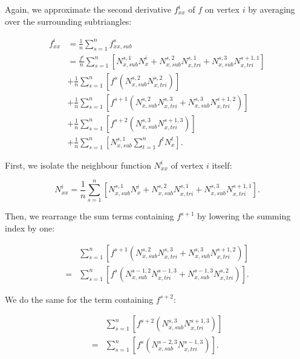 \documentclass{article}
\begin{document}
Again, we approximate the second derivative $f_{xx}^i$ of $f$ on vertex $i$ by averaging over the surrounding subtriangles:

\begin{equation} \label{eq:disc_fxxi}
\begin{split}
f_{xx}^i &= \frac{1}{n} \sum_{s=1}^n f_{xx,sub}^s \\
     &= \frac{f^i}{n} \sum_{s=1}^n \left[ N_{x,sub}^{s,1} N_x^i + N_{x,sub}^{s,2} N_{x,tri}^{s,1} + N_{x,sub}^{s,3} N_{x,tri}^{s+1,1} \right] \\
     & + \frac{1}{n} \sum_{s=1}^n \left[ f^s \left( N_{x,sub}^{s,2} N_{x,tri}^{s,2} \right) \right] \\
     & + \frac{1}{n} \sum_{s=1}^n \left[ f^{s+1} \left( N_{x,sub}^{s,2} N_{x,tri}^{s,3} + N_{x,sub}^{s,3} N_{x,tri}^{s+1,2} \right) \right] \\
     & + \frac{1}{n} \sum_{s=1}^n \left[ f^{s+2} \left( N_{x,sub}^{s,3} N_{x,tri}^{s+1,3} \right) \right] \\
     & + \frac{1}{n} \sum_{s=1}^n \left[ N_{x,sub}^{s,1} \sum_{t=1}^n f^t N_x^t \right].
\end{split}
\end{equation}

First, we isolate the neighbour function $N_{xx}^i$  of vertex $i$ itself:

\begin{equation} \label{eq:disc_Nxxi}
N_{xx}^i = \frac{1}{n} \sum_{s=1}^n \left[ N_{x,sub}^{s,1} N_x^i + N_{x,sub}^{s,2} N_{x,tri}^{s,1} + N_{x,sub}^{s,3} N_{x,tri}^{s+1,1} \right].
\end{equation}

Then, we rearrange the sum terms containing $f^{s+1}$ by lowering the summing index by one:

\begin{equation} \label{eq:disc_fxsp1}
\begin{split}
     & \sum_{s=1}^n \left[ f^{s+1} \left( N_{x,sub}^{s,2} N_{x,tri}^{s,3} + N_{x,sub}^{s,3} N_{x,tri}^{s+1,2} \right) \right] \\
     = & \sum_{s=1}^n \left[ f^s \left( N_{x,sub}^{s-1,2} N_{x,tri}^{s-1,3} + N_{x,sub}^{s-1,3} N_{x,tri}^{s,2} \right) \right].
\end{split}
\end{equation}

We do the same for the term containing $f^{s+2}$:

\begin{equation} \label{eq:disc_fxsp2}
\begin{split}
     & \sum_{s=1}^n \left[ f^{s+2} \left( N_{x,sub}^{s,3} N_{x,tri}^{s+1,3} \right) \right] \\
     = & \sum_{s=1}^n \left[ f^s \left( N_{x,sub}^{s-2,3} N_{x,tri}^{s-1,3} \right) \right].
\end{split}
\end{equation}
\end{document}
